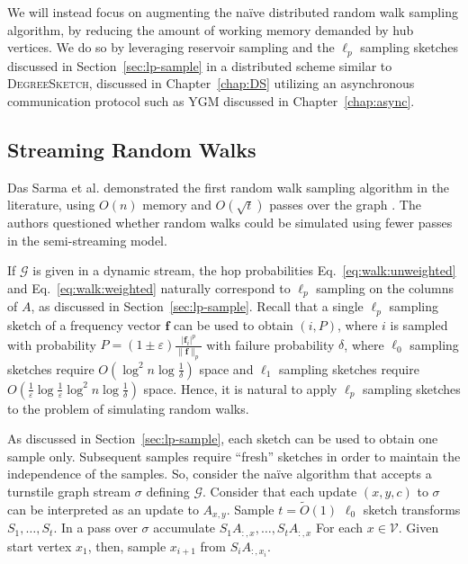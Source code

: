 \documentclass{report}
\newcommand{\algoname}[1]{\textnormal{\textsc{#1}}}
\begin{document}
We will instead focus on augmenting the na\"ive distributed random walk sampling algorithm, by reducing the amount of working memory demanded by hub vertices.
We do so by leveraging reservoir sampling and the $\ell_p$ sampling sketches discussed in Section~\ref{sec:lp-sample} in a distributed scheme similar to \algoname{DegreeSketch}, discussed in Chapter~\ref{chap:DS} utilizing an asynchronous communication protocol such as \algoname{YGM} discussed in Chapter~\ref{chap:async}.

\subsection{Streaming Random Walks}
 \label{walks:sec:streaming:rw}

Das Sarma et al. demonstrated the first random walk sampling algorithm in the literature, using $O(n)$ memory and $O(\sqrt{t})$ passes over the graph \cite{sarma2011estimating}. 
The authors questioned whether random walks could be simulated using fewer passes in the semi-streaming model. 

If $\mathcal{G}$ is given in a dynamic stream, the hop probabilities Eq.~\eqref{eq:walk:unweighted} and Eq.~\ref{eq:walk:weighted} naturally correspond to $\ell_p$ sampling on the columns of $A$, as discussed in Section~\ref{sec:lp-sample}.
Recall that a single $\ell_p$ sampling sketch of a frequency vector $\mathbf{f}$ can be used to obtain $(i, P)$, where $i$ is sampled with probability $P = (1 \pm \varepsilon)\frac{|\mathbf{f}_i|^p}{\|\mathbf{f}\|_p}$ with failure probability $\delta$, where $\ell_0$ sampling sketches require $O \left ( \log^2 n \log \frac{1}{\delta} \right)$ space and $\ell_1$ sampling sketches require $O \left ( \frac{1}{\varepsilon} \log \frac{1}{\varepsilon} \log^2 n \log \frac{1}{\delta} \right )$ space.
Hence, it is natural to apply $\ell_p$ sampling sketches to the problem of simulating random walks.


As discussed in Section~\ref{sec:lp-sample}, each sketch can be used to obtain one sample only. 
Subsequent samples require ``fresh'' sketches in order to maintain the independence of the samples.
So, consider the na\"ive algorithm that accepts a turnstile graph stream $\sigma$ defining $\mathcal{G}$.
Consider that each update $(x, y, c)$ to $\sigma$ can be interpreted as an update to $A_{x,y}$.
Sample $t = \widetilde{O}(1)$ $\ell_0$ sketch transforms $S_1, \dots, S_t$. 
In a pass over $\sigma$ accumulate $S_1A_{:,x}, \dots, S_t A_{:,x}$ For each $x \in \mathcal{V}$.
Given start vertex $x_1$, then, sample $x_{i+1}$ from $S_i A_{:, x_i}$.
\end{document}
